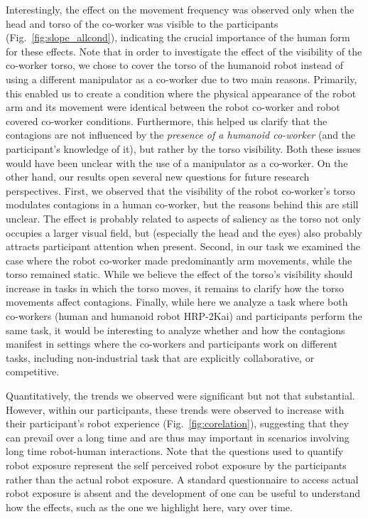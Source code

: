 \documentclass[a4paper, 12pt, oneside]{Thesis}  %
\begin{document}
Interestingly, the effect on the movement frequency was observed only when the head and torso of the co-worker was visible to the participants (Fig.~\ref{fig:slope_allcond}), indicating the crucial importance of the human form for these effects. Note that in order to investigate the effect of the visibility of the co-worker torso, we chose to cover the torso of the humanoid robot instead of using a different manipulator as a co-worker due to two main reasons. Primarily, this enabled us to create a condition where the physical appearance of the robot arm and its movement were identical between the robot co-worker and robot covered co-worker conditions. Furthermore, this helped us clarify that the contagions are not influenced by the \textit{presence of a humanoid co-worker} (and the participant's knowledge of it), but rather by the torso visibility. Both these issues would have been unclear with the use of a manipulator as a co-worker. On the other hand, our results open several new questions for future research perspectives. First, we observed that the visibility of the robot co-worker's torso modulates contagions in a  human co-worker, but the reasons behind this are still unclear. The effect is probably related to aspects of saliency as the torso not only occupies a larger visual field, but (especially the head and the eyes) also probably attracts participant attention when present. Second, in our task we examined the case where the robot co-worker made predominantly arm movements, while the torso remained static. While we believe the effect of the torso's visibility should increase in tasks in which the torso moves, it remains to clarify how the torso movements affect contagions. Finally, while here we analyze a task where both co-workers (human and humanoid robot HRP-2Kai) and participants perform the same task, it would be interesting to analyze whether and how the contagions manifest in settings where the co-workers and participants work on different tasks, including non-industrial task that are explicitly collaborative, or competitive.


Quantitatively, the trends we observed were significant but not that substantial. However, within our participants, these trends were observed to increase with their participant's robot experience (Fig.~\ref{fig:corelation}), suggesting that they can prevail over a long time and are thus may important in scenarios involving long time robot-human interactions. Note that the questions used to quantify robot exposure represent the self perceived robot exposure by the participants rather than the actual robot exposure. A standard questionnaire to access actual robot exposure is absent and the development of one can be useful to understand how the effects, such as the one we highlight here, vary over time. 
\end{document}
